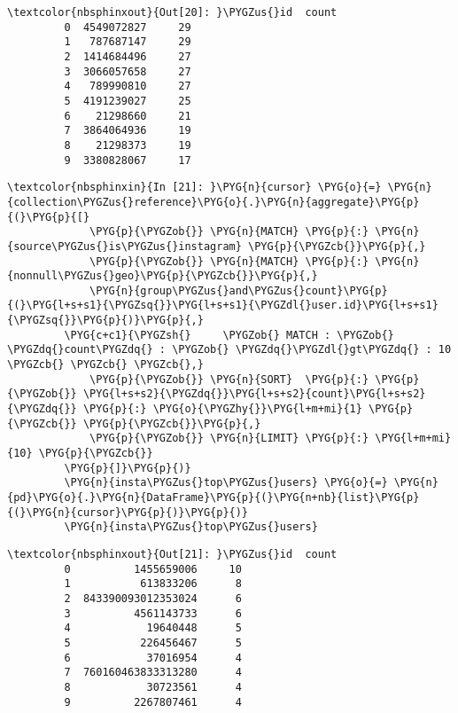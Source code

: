 \documentclass[letterpaper,10pt,english]{sphinxmanual}
\begin{document}
%
\begin{Verbatim}[commandchars=\\\{\}]
\textcolor{nbsphinxout}{Out[20]: }\PYGZus{}id  count
         0  4549072827     29
         1   787687147     29
         2  1414684496     27
         3  3066057658     27
         4   789990810     27
         5  4191239027     25
         6    21298660     21
         7  3864064936     19
         8    21298373     19
         9  3380828067     17
\end{Verbatim}

%
\begin{Verbatim}[commandchars=\\\{\}]
\textcolor{nbsphinxin}{In [21]: }\PYG{n}{cursor} \PYG{o}{=} \PYG{n}{collection\PYGZus{}reference}\PYG{o}{.}\PYG{n}{aggregate}\PYG{p}{(}\PYG{p}{[}
             \PYG{p}{\PYGZob{}} \PYG{n}{MATCH} \PYG{p}{:} \PYG{n}{source\PYGZus{}is\PYGZus{}instagram} \PYG{p}{\PYGZcb{}}\PYG{p}{,}
             \PYG{p}{\PYGZob{}} \PYG{n}{MATCH} \PYG{p}{:} \PYG{n}{nonnull\PYGZus{}geo}\PYG{p}{\PYGZcb{}}\PYG{p}{,}
             \PYG{n}{group\PYGZus{}and\PYGZus{}count}\PYG{p}{(}\PYG{l+s+s1}{\PYGZsq{}}\PYG{l+s+s1}{\PYGZdl{}user.id}\PYG{l+s+s1}{\PYGZsq{}}\PYG{p}{)}\PYG{p}{,}
         \PYG{c+c1}{\PYGZsh{}     \PYGZob{} MATCH : \PYGZob{} \PYGZdq{}count\PYGZdq{} : \PYGZob{} \PYGZdq{}\PYGZdl{}gt\PYGZdq{} : 10 \PYGZcb{} \PYGZcb{} \PYGZcb{},}
             \PYG{p}{\PYGZob{}} \PYG{n}{SORT}  \PYG{p}{:} \PYG{p}{\PYGZob{}} \PYG{l+s+s2}{\PYGZdq{}}\PYG{l+s+s2}{count}\PYG{l+s+s2}{\PYGZdq{}} \PYG{p}{:} \PYG{o}{\PYGZhy{}}\PYG{l+m+mi}{1} \PYG{p}{\PYGZcb{}} \PYG{p}{\PYGZcb{}}\PYG{p}{,}
             \PYG{p}{\PYGZob{}} \PYG{n}{LIMIT} \PYG{p}{:} \PYG{l+m+mi}{10} \PYG{p}{\PYGZcb{}}
         \PYG{p}{]}\PYG{p}{)}
         \PYG{n}{insta\PYGZus{}top\PYGZus{}users} \PYG{o}{=} \PYG{n}{pd}\PYG{o}{.}\PYG{n}{DataFrame}\PYG{p}{(}\PYG{n+nb}{list}\PYG{p}{(}\PYG{n}{cursor}\PYG{p}{)}\PYG{p}{)}
         \PYG{n}{insta\PYGZus{}top\PYGZus{}users}
\end{Verbatim}

%
\begin{Verbatim}[commandchars=\\\{\}]
\textcolor{nbsphinxout}{Out[21]: }\PYGZus{}id  count
         0          1455659006     10
         1           613833206      8
         2  843390093012353024      6
         3          4561143733      6
         4            19640448      5
         5           226456467      5
         6            37016954      4
         7  760160463833313280      4
         8            30723561      4
         9          2267807461      4
\end{Verbatim}
\end{document}
